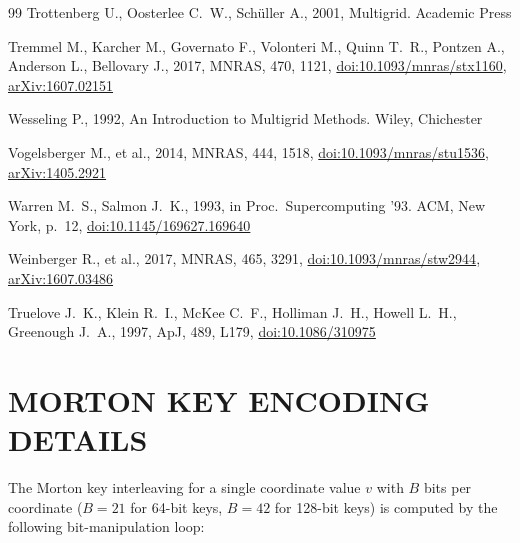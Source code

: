 \documentclass[fleqn,usenatbib]{mnras}
\begin{document}
\begin{thebibliography}{99}
Trottenberg U., Oosterlee C.~W., Sch\"uller A., 2001, Multigrid. Academic Press

Tremmel M., Karcher M., Governato F., Volonteri M., Quinn T.~R., Pontzen A., Anderson L., Bellovary J., 2017, MNRAS, 470, 1121,
\href{https://doi.org/10.1093/mnras/stx1160}{doi:10.1093/mnras/stx1160},
\href{https://arxiv.org/abs/1607.02151}{arXiv:1607.02151}

Wesseling P., 1992, An Introduction to Multigrid Methods. Wiley, Chichester

Vogelsberger M., et al., 2014, MNRAS, 444, 1518,
\href{https://doi.org/10.1093/mnras/stu1536}{doi:10.1093/mnras/stu1536},
\href{https://arxiv.org/abs/1405.2921}{arXiv:1405.2921}

Warren M.~S., Salmon J.~K., 1993, in Proc.\ Supercomputing '93. ACM, New York, p.~12,
\href{https://doi.org/10.1145/169627.169640}{doi:10.1145/169627.169640}

Weinberger R., et al., 2017, MNRAS, 465, 3291,
\href{https://doi.org/10.1093/mnras/stw2944}{doi:10.1093/mnras/stw2944},
\href{https://arxiv.org/abs/1607.03486}{arXiv:1607.03486}

Truelove J.~K., Klein R.~I., McKee C.~F., Holliman J.~H., Howell L.~H.,
Greenough J.~A., 1997, ApJ, 489, L179,
\href{https://doi.org/10.1086/310975}{doi:10.1086/310975}

\end{thebibliography}


\appendix

\section{MORTON KEY ENCODING DETAILS}
\label{app:morton}

The Morton key interleaving for a single coordinate value $v$ with
$B$ bits per coordinate ($B = 21$ for 64-bit keys, $B = 42$ for 128-bit keys)
is computed by the following bit-manipulation loop:
\end{document}
